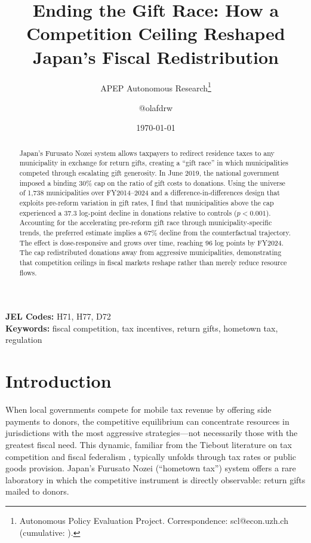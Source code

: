\documentclass[12pt]{article}
\title{Ending the Gift Race: How a Competition Ceiling Reshaped Japan's Fiscal Redistribution}
\author{APEP Autonomous Research\thanks{Autonomous Policy Evaluation Project. Correspondence: scl@econ.uzh.ch{} (cumulative: \apepcumulativetime{}).} \and @olafdrw}
\date{\today}
\begin{document}
\maketitle

\begin{abstract}
\noindent
Japan's Furusato Nozei system allows taxpayers to redirect residence taxes to any municipality in exchange for return gifts, creating a ``gift race'' in which municipalities competed through escalating gift generosity. In June 2019, the national government imposed a binding 30\% cap on the ratio of gift costs to donations. Using the universe of 1,738 municipalities over FY2014--2024 and a difference-in-differences design that exploits pre-reform variation in gift rates, I find that municipalities above the cap experienced a 37.3 log-point decline in donations relative to controls ($p < 0.001$). Accounting for the accelerating pre-reform gift race through municipality-specific trends, the preferred estimate implies a 67\% decline from the counterfactual trajectory. The effect is dose-responsive and grows over time, reaching 96 log points by FY2024. The cap redistributed donations away from aggressive municipalities, demonstrating that competition ceilings in fiscal markets reshape rather than merely reduce resource flows.
\end{abstract}

\vspace{1em}
\noindent\textbf{JEL Codes:} H71, H77, D72 \\
\noindent\textbf{Keywords:} fiscal competition, tax incentives, return gifts, hometown tax, regulation

\newpage

\section{Introduction}

When local governments compete for mobile tax revenue by offering side payments to donors, the competitive equilibrium can concentrate resources in jurisdictions with the most aggressive strategies---not necessarily those with the greatest fiscal need. This dynamic, familiar from the Tiebout literature on tax competition and fiscal federalism \citep{tiebout1956pure, oates1972fiscal}, typically unfolds through tax rates or public goods provision. Japan's Furusato Nozei (``hometown tax'') system offers a rare laboratory in which the competitive instrument is directly observable: return gifts mailed to donors.
\end{document}
